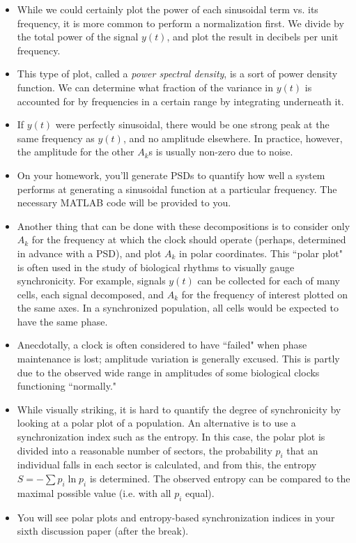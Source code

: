 \documentclass{article}
\begin{document}
\begin{itemize}
\item While we could certainly plot the power of each sinusoidal term vs. its frequency, it is more common to perform a normalization first. We divide by the total power of the signal $y(t)$, and plot the result in decibels per unit frequency. 

\item This type of plot, called a \textit{power spectral density}, is a sort of power density function. We can determine what fraction of the variance in $y(t)$ is accounted for by frequencies in a certain range by integrating underneath it.

\item If $y(t)$ were perfectly sinusoidal, there would be one strong peak at the same frequency as $y(t)$, and no amplitude elsewhere. In practice, however, the amplitude for the other $A_k$s is usually non-zero due to noise.

\item On your homework, you'll generate PSDs to quantify how well a system performs at generating a sinusoidal function at a particular frequency. The necessary MATLAB code will be provided to you.

\item Another thing that can be done with these decompositions is to consider only $A_k$ for the frequency at which the clock should operate (perhaps, determined in advance with a PSD), and plot $A_k$ in polar coordinates. This ``polar plot" is often used in the study of biological rhythms to visually gauge synchronicity. For example, signals $y(t)$ can be collected for each of many cells, each signal decomposed, and $A_k$ for the frequency of interest plotted on the same axes. In a synchronized population, all cells would be expected to have the same phase.

\item Anecdotally, a clock is often considered to have ``failed" when phase maintenance is lost; amplitude variation is generally excused. This is partly due to the observed wide range in amplitudes of some biological clocks functioning ``normally."

\item While visually striking, it is hard to quantify the degree of synchronicity by looking at a polar plot of a population. An alternative is to use a synchronization index such as the entropy. In this case, the polar plot is divided into a reasonable number of sectors, the probability $p_i$ that an individual falls in each sector is calculated, and from this, the entropy $S = - \sum p_i \ln p_i$ is determined. The observed entropy can be compared to the maximal possible value (i.e. with all $p_i$ equal).

\item You will see polar plots and entropy-based synchronization indices in your sixth discussion paper (after the break).
\end{itemize}
\end{document}
